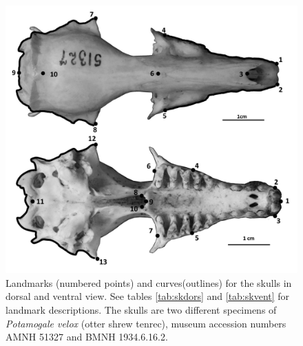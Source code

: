 \begin{figure}[!htbp]
	\centering
	\includegraphics[width=1\linewidth]{Methods/figures/Skdors+Skvent_combined_BW.png}
	\caption[Skulls: dorsal and ventral landmarks]
	{Landmarks (numbered points) and curves(outlines) for the skulls in dorsal and ventral view. See tables \ref{tab:skdors} and \ref{tab:skvent} for landmark descriptions. The skulls are two different specimens of \textit{Potamogale velox} (otter shrew tenrec), museum accession numbers AMNH 51327 and BMNH 1934.6.16.2. }
	\label{fig:skdors_skvent}
\end{figure}


\begin{table}[h]
	\caption[Skulls: dorsal landmarks]
		{Descriptions of the landmarks (points) and curves (semilandmarks) for the skulls in dorsal view (figure
		\ref{fig:skdors_skvent})} 
	
	\label{tab:skdors}
\end{table}

\begin{table}[!htb] %
\caption[Skulls: ventral landmarks]
		{Descriptions of the landmarks (points) and curves (semilandmarks) for the skulls in ventral view (figure \ref{fig:skdors_skvent}).} 

\label{tab:skvent}
\end{table}

